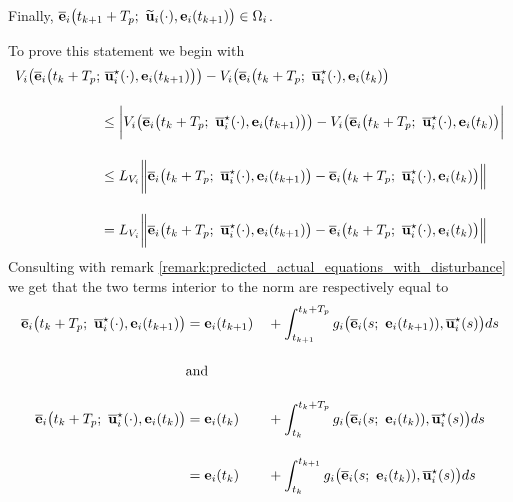 Finally, $\overline{\bm{\mathbf{e}}}_i\big(t_{k+1} + T_p;\ \widetilde{\bm{\mathbf{u}}}_i(\cdot), \bm{\mathbf{e}}_i(t_{k+1}) \big) \in \Omega_i$.\\[1ex]
\begin{gg_box}
To prove this statement we begin with
\begin{align}
  V_i\big(\overline{\vect{e}}_i\big(t_k + T_p;&\ \overline{\vect{u}}_i^{\star}(\cdot), \vect{e}_i(t_{k+1})\big)\big)
    - V_i\big(\overline{\vect{e}}_i\big(t_k + T_p;\ \overline{\vect{u}}_i^{\star}(\cdot), \vect{e}_i(t_k)\big) \\[2.5ex]
  &\leq \bigg|  V_i\big(\overline{\vect{e}}_i\big(t_k + T_p;\ \overline{\vect{u}}_i^{\star}(\cdot), \vect{e}_i(t_{k+1})\big)\big)
    - V_i\big(\overline{\vect{e}}_i\big(t_k + T_p;\ \overline{\vect{u}}_i^{\star}(\cdot), \vect{e}_i(t_k)\big) \bigg | \\[2.5ex]
  &\leq L_{V_i}\bigg \| \overline{\vect{e}}_i\big(t_k + T_p;\ \overline{\vect{u}}_i^{\star}(\cdot), \vect{e}_i(t_{k+1})\big)
    - \overline{\vect{e}}_i\big(t_k + T_p;\ \overline{\vect{u}}_i^{\star}(\cdot), \vect{e}_i(t_k) \big)\Big\| \\[2.5ex]
  &=  L_{V_i}\bigg \|  \overline{\vect{e}}_i\big(t_k + T_p;\ \overline{\vect{u}}_i^{\star}(\cdot), \vect{e}_i(t_{k+1})\big)
    - \overline{\vect{e}}_i\big(t_k + T_p;\ \overline{\vect{u}}_i^{\star}(\cdot), \vect{e}_i(t_k) \big)\Big\|
\label{eq:from_DV_to_De}
\end{align}
Consulting with remark \eqref{remark:predicted_actual_equations_with_disturbance}
we get that the two terms interior to the norm are respectively equal to
\begin{alignat}{2}
  \overline{\vect{e}}_i\big(t_k + T_p;\ \overline{\vect{u}}_i^{\star}(\cdot), \vect{e}_i(t_{k+1})\big)
    &= \vect{e}_i(t_{k+1}) &&+ \int_{t_{k+1}}^{t_k + T_p} g_i\big(\overline{\vect{e}}_i(s;\ \vect{e}_i(t_{k+1})), \overline{\vect{u}}_i^{\star}(s) \big)ds \\[2.5ex]
    &\text{and}\\[2.5ex]
  \overline{\vect{e}}_i\big(t_k + T_p;\ \overline{\vect{u}}_i^{\star}(\cdot), \vect{e}_i(t_k)\big)
    &= \vect{e}_i(t_k)     &&+ \int_{t_k}^{t_k + T_p} g_i\big(\overline{\vect{e}}_i(s;\ \vect{e}_i(t_k)), \overline{\vect{u}}_i^{\star}(s) \big)ds \\[2.5ex]
    &= \vect{e}_i(t_k)     &&+ \int_{t_k}^{t_{k+1}} g_i\big(\overline{\vect{e}}_i(s;\ \vect{e}_i(t_k)), \overline{\vect{u}}_i^{\star}(s) \big)ds \\[2.5ex]

\end{alignat}
\end{gg_box}
